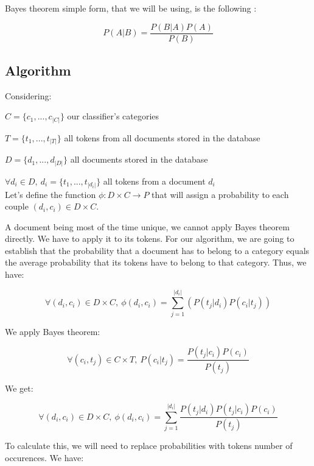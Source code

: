 \documentclass[a4paper,11pt]{article}
\begin{document}
Bayes theorem simple form, that we will be using, is the following :

\begin{equation}
    P(A| B) = \frac{P(B | A) P(A)}{P(B)}
\end{equation}


\subsection{Algorithm}

Considering:

$C = \{c_1, ..., c_{|C|}\}$ our classifier's categories

$T = \{t_1, ..., t_{|T|}\}$ all tokens from all documents stored in the database

$D = \{d_1, ..., d_{|D|}\}$ all documents stored in the database

$\forall d_i \in D,\ d_i = \{t_1, ..., t_{|d_i|}\}$ all tokens from a document $d_i$
~\\

Let's define the function $\phi : D \times C \rightarrow P$ that will assign
a probability to each couple
$(d_i, c_i) \in D \times C$.

A document being most of the time unique, we cannot apply Bayes theorem
directly. We have to apply it to its tokens. For our algorithm, we are going
to establish that the probability that a document has to belong to a category
equals the average probability that its tokens have to belong to that
category. Thus, we have:

\begin{equation}
    \forall (d_i, c_i) \in D \times C,\ 
    \phi(d_i, c_i)
    = \sum_{j=1}^{|d_i|} (P(t_j | d_i) P(c_i | t_j))
\end{equation}

We apply Bayes theorem:

\begin{equation}
    \forall (c_i, t_j) \in C \times T,\ 
    P(c_i| t_j)
    = \frac{P(t_j | c_i) P(c_i)}{P(t_j)}
\end{equation}

We get:

\begin{equation}\label{eq:final_prob}
    \forall (d_i, c_i) \in D \times C,\ 
    \phi(d_i, c_i)
    = \sum_{j=1}^{|d_i|} \frac{P(t_j | d_i) P(t_j | c_i) P(c_i)}{P(t_j)}
\end{equation}

To calculate this, we will need to replace probabilities with tokens number of
occurences. We have:
\end{document}

